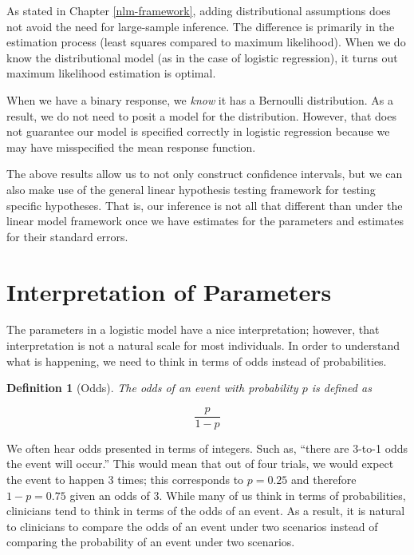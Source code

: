 \documentclass[
]{book}
\theoremstyle{plain}
\theoremstyle{mydefn}
\newtheorem{definition}{Definition}[chapter]
\theoremstyle{myexmpl}
\theoremstyle{remark}
\begin{document}
As stated in Chapter \ref{nlm-framework}, adding distributional assumptions does not avoid the need for large-sample inference. The difference is primarily in the estimation process (least squares compared to maximum likelihood). When we do know the distributional model (as in the case of logistic regression), it turns out maximum likelihood estimation is optimal.

\begin{rmdwarning}
When we have a binary response, we \emph{know} it has a Bernoulli distribution. As a result, we do not need to posit a model for the distribution. However, that does not guarantee our model is specified correctly in logistic regression because we may have misspecified the mean response function.
\end{rmdwarning}

The above results allow us to not only construct confidence intervals, but we can also make use of the general linear hypothesis testing framework for testing specific hypotheses. That is, our inference is not all that different than under the linear model framework once we have estimates for the parameters and estimates for their standard errors.

\hypertarget{interpretation-of-parameters}{%
\section{Interpretation of Parameters}\label{interpretation-of-parameters}}

The parameters in a logistic model have a nice interpretation; however, that interpretation is not a natural scale for most individuals. In order to understand what is happening, we need to think in terms of odds instead of probabilities.

\begin{definition}[Odds]
The odds of an event with probability \(p\) is defined as

\[\frac{p}{1-p}\]
\end{definition}

We often hear odds presented in terms of integers. Such as, ``there are 3-to-1 odds the event will occur.'' This would mean that out of four trials, we would expect the event to happen 3 times; this corresponds to \(p = 0.25\) and therefore \(1 - p = 0.75\) given an odds of 3. While many of us think in terms of probabilities, clinicians tend to think in terms of the odds of an event. As a result, it is natural to clinicians to compare the odds of an event under two scenarios instead of comparing the probability of an event under two scenarios.
\end{document}
